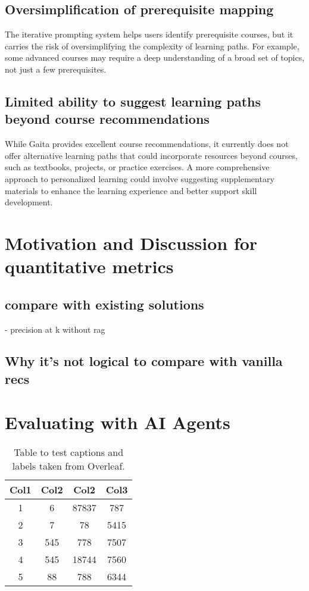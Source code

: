 \subsection{Oversimplification of prerequisite mapping}

The iterative prompting system helps users identify prerequisite courses, but it carries the risk of oversimplifying the complexity of learning paths. For example, some advanced courses may require a deep understanding of a broad set of topics, not just a few prerequisites. 

\subsection{Limited ability to suggest learning paths beyond course recommendations}

While Gaita provides excellent course recommendations, it currently does not offer alternative learning paths that could incorporate resources beyond courses, such as textbooks, projects, or practice exercises. A more comprehensive approach to personalized learning could involve suggesting supplementary materials to enhance the learning experience and better support skill development.

\section{Motivation and Discussion for quantitative metrics}

\subsection{compare with existing solutions}

- precision at k without rag
\subsection{Why it's not logical to compare with vanilla recs}

\section{Evaluating with AI Agents}



\begin{table}[h!]
\centering
\begin{tabular}{c c c c} 
\toprule \toprule
Col1 & Col2 & Col2 & Col3 \\ 
\toprule \toprule
1 & 6 & 87837 & 787 \\ 
2 & 7 & 78 & 5415 \\
3 & 545 & 778 & 7507 \\
4 & 545 & 18744 & 7560 \\
5 & 88 & 788 & 6344 \\ 
\bottomrule
\end{tabular}
\caption{Table to test captions and labels taken from Overleaf.}
\label{table:1}
\end{table}
